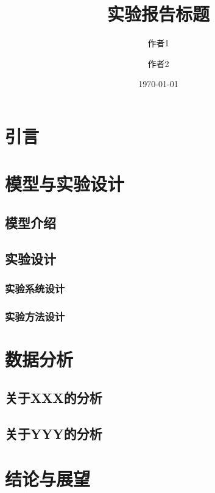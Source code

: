 \documentclass[12pt]{ctexart}   %
\title{\bfseries 实验报告标题}     %
\author{作者1 \and 作者2}         %
\date{\today}                    %
\begin{document}
\maketitle      %

\tableofcontents


\section{引言}

\lipsum[2-3]


\section{模型与实验设计}

\subsection{模型介绍}

\lipsum[4-5]


\subsection{实验设计}

\subsubsection{实验系统设计}

\lipsum[3-4]

\subsubsection{实验方法设计}

\lipsum[5-6]


\section{数据分析}

\subsection{关于XXX的分析}

\lipsum[1-3]

\subsection{关于YYY的分析}

\lipsum[7-8]


\section{结论与展望}

\lipsum[9]
\end{document}
